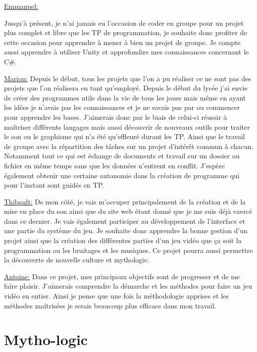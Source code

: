 \documentclass[12pt]{extarticle}
\begin{document}
\vspace{0.5cm}
\underline{Emmanuel:}

Jusqu'à présent, je n'ai jamais eu l'occasion de coder en groupe pour un projet plus complet et libre que les TP de programmation, je souhaite donc profiter de cette occasion pour apprendre à mener à bien un projet de groupe. Je compte aussi apprendre à utiliser Unity et approfondire mes connaissances concernant le C\#.

\vspace{0.5cm}
\underline{Marion:}
Depuis le début, tous les projets que l'on a pu réaliser ce ne sont pas des projets que l'on réalisera en tant qu'employé. Depuis le début du lycée j'ai envie de créer des programmes utile dans la vie de tous les jours mais même en ayant les idées je n'avais pas les connaissances et je ne savais pas par ou commencer pour apprendre les bases. J'aimerais donc par le biais de celui-ci réussir à maîtriser différents langages mais aussi découvrir de nouveaux outils pour traiter le son ou le graphisme qui n'a été qu'effleuré durant les TP. Ainsi que le travail de groupe avec la répartition des tâches sur un projet d’intérêt commun à chacun. Notamment tout ce qui est échange de documents et travail sur un dossier ou fichier en même temps sans que les données n'entrent en conflit. J'espère également obtenir une certaine autonomie dans la création de programme qui pour l'instant sont guidés en TP.

\vspace{0.5cm}
\underline{Thibault:}
De mon côté, je vais m'occuper principalement de la création et de la mise en place du son ainsi que du site web étant donné que je me suis déjà exercé dans ce dernier. Je vais également participer au développement de l'interface et une partie du système du jeu.
Je souhaite donc apprendre la bonne gestion d'un projet ainsi que la création des différentes parties d'un jeu vidéo que ça soit la programmation ou les bruitages et les musiques.
Ce projet pourra aussi permettre la découverte de nouvelle culture et mythologie.

\vspace{0.5cm}
\underline{Antoine:}
Dans ce projet, mes principaux objectifs sont de progresser et de me faire plaisir. J’aimerais comprendre la démarche et les méthodes pour faire un jeu vidéo en entier. Ainsi je pense que une fois la méthodologie apprises et les méthodes maîtrisées je serais beaucoup plus efficace dans mon travail.

\section{Mytho-logic}
\end{document}
